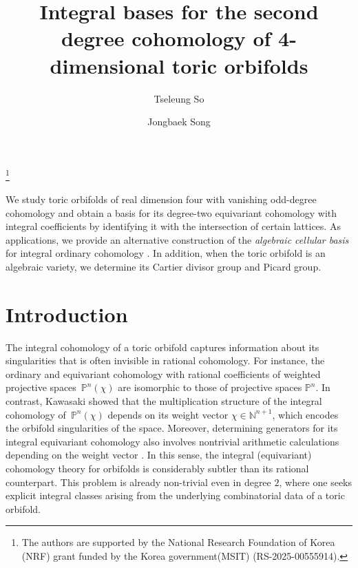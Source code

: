 \documentclass[10pt]{amsart}
\theoremstyle{plain}
\theoremstyle{definition}
\numberwithin{equation}{section}
\newcommand{\NN}{\mathbb{N}}
\newcommand{\PP}{\mathbb{P}}
\begin{document}
\title[Integral bases]{Integral bases for the second degree cohomology of 4-dimensional toric orbifolds}

\author[T. So]{Tseleung So}
\address{Institute of Mathematical Science, Pusan National University, Busan 46241, Republic of Korea}

\author[J. Song]{Jongbaek Song}
\address{Department of Mathematics Education, Pusan National University, Busan, Republic of Korea}





\thanks{The authors are supported by the National Research Foundation of Korea (NRF) grant funded by the Korea government(MSIT) (RS-2025-00555914). }








\maketitle 
\abstract 
We study toric orbifolds of real dimension four with vanishing odd-degree cohomology and obtain a basis for its degree-two equivariant cohomology with integral coefficients by identifying it with the intersection of certain lattices. As applications, we provide an alternative construction of the \emph{algebraic cellular basis} for integral ordinary cohomology \cite{FSS2}. In addition, when the toric orbifold is an algebraic variety, we determine its Cartier divisor group and Picard group.
\endabstract


\section{Introduction}



The integral cohomology of a toric orbifold captures information about its singularities that is often invisible in rational cohomology. For instance, the ordinary and equivariant cohomology with rational coefficients of weighted projective spaces~$\mathbb{P}^n(\chi)$ are isomorphic to those of projective spaces $\PP^n$. In contrast,  Kawasaki \cite{Ka} showed that the multiplication structure of the integral cohomology of~$\PP^n(\chi)$ depends on its weight vector $\chi \in \NN^{n+1}$, which encodes the orbifold singularities of the space. Moreover, determining generators for its integral equivariant cohomology also involves nontrivial arithmetic calculations depending on the weight vector \cite{BFR}. In this sense, the integral (equivariant) cohomology theory for orbifolds is considerably subtler than its rational counterpart. This problem is already non-trivial even in degree $2$, where one seeks explicit integral classes arising from the underlying combinatorial data of a toric orbifold. 
\end{document}
